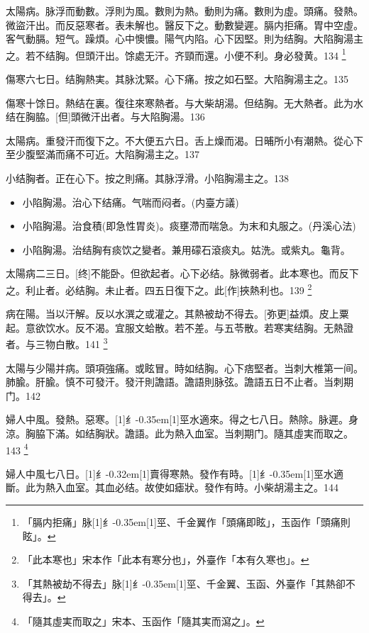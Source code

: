 \documentclass[11pt,oneside,b5paper]{ctexbook}
\begin{document}
\begin{flushleft}
太陽病。脉浮而動數。浮則为風。數則为熱。動則为痛。數則为虛。頭痛。發熱。微盜汗出。而反惡寒者。表未解也。醫反下之。動數變遲。膈内拒痛。胃中空虛。客气動膈。短气。躁煩。心中懊憹。陽气内陷。心下因堅。則为结胸。大陷胸湯主之。若不结胸。但頭汗出。馀處无汗。齐頸而還。小便不利。身必發黄。134
\footnote{「膈内拒痛」脉{\hbox{\scalebox{0.68}[1]{纟}\kern-0.35em\scalebox{0.64}[1]{巠}}}、千金翼作「頭痛即眩」，玉函作「頭痛則眩」。}

傷寒六七日。结胸熱実。其脉沈緊。心下痛。按之如石堅。大陷胸湯主之。135

傷寒十馀日。熱结在裏。復往來寒熱者。与大柴胡湯。但结胸。无大熱者。此为水结在胸脇。[但]頭微汗出者。与大陷胸湯。136

太陽病。重發汗而復下之。不大便五六日。舌上燥而渴。日晡所小有潮熱。從心下至少腹堅滿而痛不可近。大陷胸湯主之。137

小结胸者。正在心下。按之則痛。其脉浮滑。小陷胸湯主之。138

\begin{itemize}
\item 小陷胸湯。治心下结痛。气喘而闷者。(内臺方議)
\item 小陷胸湯。治食積(即急性胃炎)。痰壅滯而喘急。为末和丸服之。(丹溪心法)
\item 小陷胸湯。治结胸有痰饮之變者。兼用礞石滾痰丸。姑洗。或紫丸。龜背。
\end{itemize}

太陽病二三日。[终]不能卧。但欲起者。心下必结。脉微弱者。此本寒也。而反下之。利止者。必结胸。未止者。四五日復下之。此[作]挾熱利也。139
\footnote{「此本寒也」宋本作「此本有寒分也」，外臺作「本有久寒也」。}

病在陽。当以汗解。反以水潠之或灌之。其熱被劫不得去。[弥更]益煩。皮上粟起。意欲饮水。反不渴。宜服文蛤散。若不差。与五苓散。若寒実结胸。无熱證者。与三物白散。141
\footnote{「其熱被劫不得去」脉{\hbox{\scalebox{0.68}[1]{纟}\kern-0.35em\scalebox{0.64}[1]{巠}}}、千金翼、玉函、外臺作「其熱卻不得去」。}

太陽与少陽并病。頭項強痛。或眩冒。時如结胸。心下痞堅者。当刺大椎第一间。肺腧。肝腧。慎不可發汗。發汗則譫語。譫語則脉弦。譫語五日不止者。当刺期门。142

婦人中風。發熱。惡寒。{\hbox{\scalebox{0.68}[1]{纟}\kern-0.35em\scalebox{0.64}[1]{巠}}}水適來。得之七八日。熱除。脉遲。身涼。胸脇下滿。如结胸狀。譫語。此为熱入血室。当刺期门。隨其虛実而取之。143
\footnote{「隨其虛実而取之」宋本、玉函作「隨其実而瀉之」。}

婦人中風七八日。{\hbox{\scalebox{0.6}[1]{纟}\kern-0.32em\scalebox{0.7}[1]{賣}}}得寒熱。發作有時。{\hbox{\scalebox{0.68}[1]{纟}\kern-0.35em\scalebox{0.64}[1]{巠}}}水適斷。此为熱入血室。其血必结。故使如瘧狀。發作有時。小柴胡湯主之。144


\end{flushleft}
\end{document}

